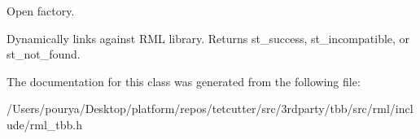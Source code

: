 Open factory. 

Dynamically links against R\+M\+L library. Returns st\+\_\+success, st\+\_\+incompatible, or st\+\_\+not\+\_\+found. 

The documentation for this class was generated from the following file\+:\begin{DoxyCompactItemize}
\item 
/\+Users/pourya/\+Desktop/platform/repos/tetcutter/src/3rdparty/tbb/src/rml/include/rml\+\_\+tbb.\+h\end{DoxyCompactItemize}
